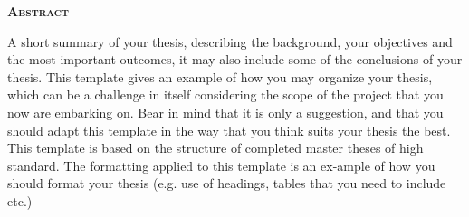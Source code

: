 %
%
%
% 
% 

{\Large \textbf{\textsc{Abstract}}}

\vspace{0.65cm}

A short summary of your thesis, describing the background, your objectives and the most important outcomes, it may also include some of the conclusions of your thesis. 
This template gives an example of how you may organize your thesis, which can be a challenge in itself considering the scope of the project that you now are embarking on. Bear in mind that it is only a suggestion, and that you should adapt this template in the way that you think suits your thesis the best. This template is based on the structure of completed master theses of high standard. The formatting applied to this template is an ex-ample of how you should format your thesis (e.g. use of headings, tables that you need to include etc.)
